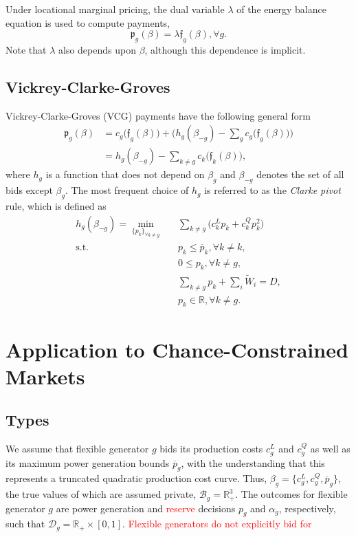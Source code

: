 \documentclass{article}
\begin{document}
Under locational marginal pricing, the dual variable $\lambda$ of the energy balance equation is used to compute payments,
\begin{equation*}
\mathfrak{p}_g(\beta) = \lambda \mathfrak{f}_g(\beta), \forall g.
\end{equation*}
Note that $\lambda$ also depends upon $\beta$, although this dependence is implicit.

\subsection{Vickrey-Clarke-Groves}

Vickrey-Clarke-Groves (VCG) payments have the following general form
\begin{align*}
\mathfrak{p}_g(\beta) &= c_g\big(\mathfrak{f}_g(\beta)\big) + \Big(h_g(\beta_{-g}) - \sum_{g} c_g\big(\mathfrak{f}_g(\beta)\big) \Big)\\
&= h_g(\beta_{-g}) - \sum_{k \ne g} c_k\big(\mathfrak{f}_k(\beta)\big),
\end{align*}
where $h_g$ is a function that does not depend on $\beta_g$ and $\beta_{-g}$ denotes the set of all bids except $\beta_g$. The most frequent choice of $h_g$ is referred to as the \textit{Clarke pivot} rule, which is defined as
\begin{align}
h_g(\beta_{-g}) = \underset{\{p_k\}_{\forall k \ne g}}{\min} \hspace{10pt} & \sum_{k \ne g} \Big(c_k^Lp_k + c_k^Q p_k^2 \Big)\\
\mbox{s.t. } & p_k \le \overline{p}_k,\forall k \ne k,\\
& 0 \le p_k,\forall k \ne g,\\
& \sum_{k \ne g} p_k + \sum_i \tilde{W}_i = D,\\
& p_k \in \mathbb{R}, \forall k \ne g.
\end{align}


\section{Application to Chance-Constrained Markets}

\subsection{Types}

We assume that flexible generator $g$ bids its production costs $c_g^L$ and $c_g^Q$ as well as its maximum power generation bounds $\overline{p}_g$, with the understanding that this represents a truncated quadratic production cost curve. Thus, $\beta_g = \{c_g^L, c_g^Q, \overline{p}_g\}$, the true values of which are assumed private, $\mathcal{B}_g = \mathbb{R}_+^3$. The outcomes for flexible generator $g$ are power generation and \textcolor{red}{reserve} decisions $p_g$ and $\alpha_g$, respectively, such that $\mathcal{D}_g = \mathbb{R}_+ \times [0, 1]$. \textcolor{red}{Flexible generators do not explicitly bid for }
\end{document}
